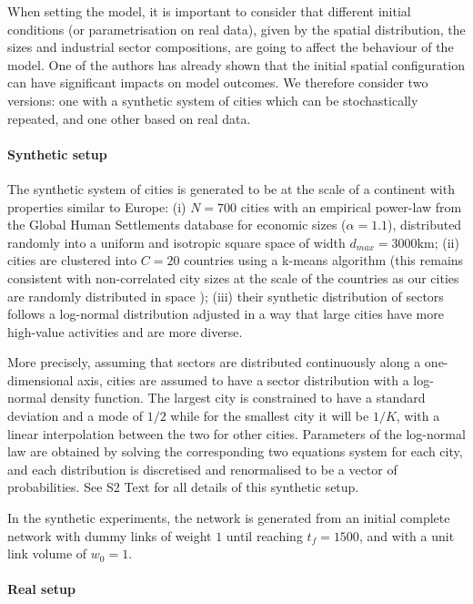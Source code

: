\documentclass[10pt,letterpaper]{article}
\begin{document}
When setting the model, it is important to consider that different initial conditions (or parametrisation on real data), given by the spatial distribution, the sizes and industrial sector compositions, are going to affect the behaviour of the model. One of the authors \cite{raimbault2019space} has already shown that the initial spatial configuration can have significant impacts on model outcomes. We therefore consider two versions: one with a synthetic system of cities which can be stochastically repeated, and one other based on real data.


\paragraph{Synthetic setup}

The synthetic system of cities is generated to be at the scale of a continent with properties similar to Europe: (i) $N=700$ cities with an empirical power-law from the Global Human Settlements database for economic sizes ($\alpha = 1.1$), distributed randomly into a uniform and isotropic square space of width $d_{max}=3000$km;
(ii) cities are clustered into $C = 20$ countries using a k-means algorithm (this remains consistent with non-correlated city sizes at the scale of the countries as our cities are randomly distributed in space \cite{simini2019testing});
(iii) their synthetic distribution of sectors follows a log-normal distribution adjusted in a way that large cities have more high-value activities and are more diverse.

More precisely, assuming that sectors are distributed continuously along a one-dimensional axis, cities are assumed to have a sector distribution with a log-normal density function. The largest city is constrained to have a standard deviation and a mode of $1/2$ while for the smallest city it will be $1/K$, with a linear interpolation between the two for other cities. Parameters of the log-normal law are obtained by solving the corresponding two equations system for each city, and each distribution is discretised and renormalised to be a vector of probabilities. See S2 Text for all details of this synthetic setup.

In the synthetic experiments, the network is generated from an initial complete network with dummy links of weight $1$ until reaching $t_f=1500$, and with a unit link volume of $w_0 = 1$.

     
\paragraph{Real setup}
\end{document}
